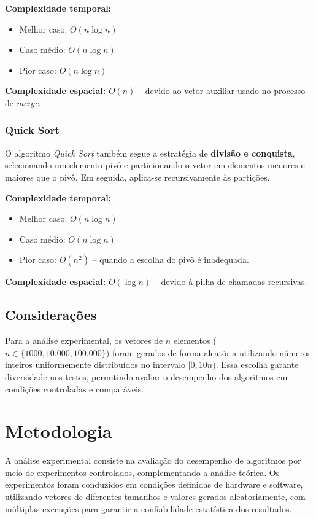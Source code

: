 \documentclass[12pt]{article}
\begin{document}
\textbf{Complexidade temporal:}
\begin{itemize}
    \item Melhor caso: $O(n \log n)$
    \item Caso médio: $O(n \log n)$
    \item Pior caso: $O(n \log n)$
\end{itemize}

\textbf{Complexidade espacial:} $O(n)$ -- devido ao vetor auxiliar usado no processo de \textit{merge}.

\subsubsection{Quick Sort}

O algoritmo \textit{Quick Sort} também segue a estratégia de \textbf{divisão e conquista}, selecionando um elemento pivô e particionando o vetor em elementos menores e maiores que o pivô. Em seguida, aplica-se recursivamente às partições.

\textbf{Complexidade temporal:}
\begin{itemize}
    \item Melhor caso: $O(n \log n)$
    \item Caso médio: $O(n \log n)$
    \item Pior caso: $O(n^2)$ -- quando a escolha do pivô é inadequada.
\end{itemize}

\textbf{Complexidade espacial:} $O(\log n)$ -- devido à pilha de chamadas recursivas.

\subsection{Considerações}

Para a análise experimental, os vetores de $n$ elementos ($n \in \{1000, 10.000, 100.000\}$) foram gerados de forma aleatória utilizando números inteiros uniformemente distribuídos no intervalo $[0, 10n)$. Essa escolha garante diversidade nos testes, permitindo avaliar o desempenho dos algoritmos em condições controladas e comparáveis.

\section{Metodologia}

A análise experimental consiste na avaliação do desempenho de algoritmos por meio de experimentos controlados, complementando a análise teórica. Os experimentos foram conduzidos em condições definidas de hardware e software, utilizando vetores de diferentes tamanhos e valores gerados aleatoriamente, com múltiplas execuções para garantir a confiabilidade estatística dos resultados. 
\end{document}
